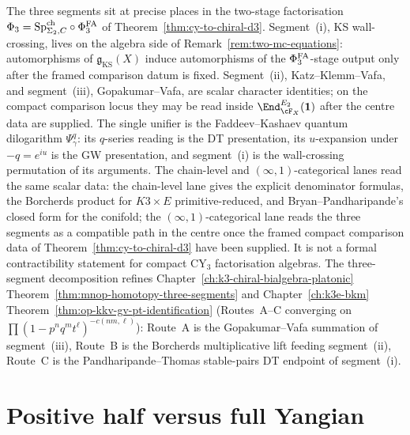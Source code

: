\begin{remark}
\label{rem:mnop-three-segments-through-phi-fa}
The three segments sit at precise places in the two-stage factorisation
$\Phi_{3} = \mathrm{Sp}^{\mathrm{ch}}_{\Sigma_{2}, C} \circ \Phi^{\mathrm{FA}}_{3}$ of
Theorem~\ref{thm:cy-to-chiral-d3}.
Segment~(i), KS wall-crossing, lives on the algebra side of
Remark~\ref{rem:two-mc-equations}: automorphisms of
$\mathfrak{g}_{\mathrm{KS}}(X)$ induce automorphisms of the
$\Phi^{\mathrm{FA}}_{3}$-stage output only after the framed comparison datum is
fixed. Segment~(ii), Katz--Klemm--Vafa, and segment~(iii),
Gopakumar--Vafa, are scalar character identities; on the compact
comparison locus they may be read inside
$\End^{E_2}_{\cF_X}(\mathbf{1})$ after the centre data are supplied. The
single unifier is the Faddeev--Kashaev quantum
dilogarithm $\Psi^{q}_\gamma$: its $q$-series reading is the DT
presentation, its $u$-expansion under $-q = e^{iu}$ is the GW
presentation, and segment~(i) is the wall-crossing permutation of its
arguments. The chain-level and $(\infty,1)$-categorical lanes read the
    same scalar data: the chain-level lane gives the explicit denominator
formulas, the Borcherds product for $K3 \times E$ primitive-reduced,
and Bryan--Pandharipande's closed form for the conifold; the
$(\infty,1)$-categorical lane reads the three segments as a
compatible path in the centre once the framed compact comparison data
of Theorem~\ref{thm:cy-to-chiral-d3} have been supplied. It is not a
formal contractibility statement for compact CY$_3$ factorisation
algebras.
The three-segment decomposition refines
Chapter~\ref{ch:k3-chiral-bialgebra-platonic}
Theorem~\ref{thm:mnop-homotopy-three-segments} and
Chapter~\ref{ch:k3e-bkm}
Theorem~\ref{thm:op-kkv-gv-pt-identification}
(Routes~A--C converging on $\prod (1 - p^{n} q^{m} t^{\ell})^{-c(nm, \ell)}$):
Route~A is the Gopakumar--Vafa summation of segment~(iii), Route~B is
the Borcherds multiplicative lift feeding segment~(ii), Route~C is the
Pandharipande--Thomas stable-pairs DT endpoint of segment~(i).
\end{remark}

\section{Positive half versus full Yangian}
\label{sec:y-plus-vs-full-y}

